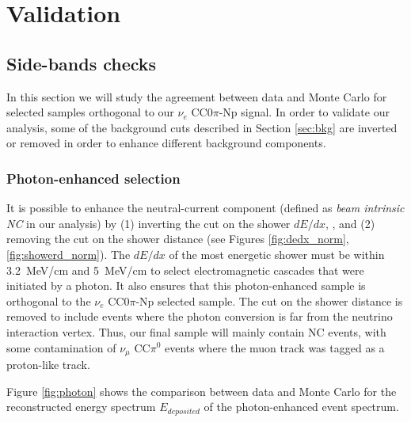 
\section{Validation}

\subsection{Side-bands checks}
In this section we will study the agreement between data and Monte Carlo for selected samples orthogonal to our $\nu_{e}$ CC0$\pi$-Np signal. In order to validate our analysis, some of the background cuts described in Section \ref{sec:bkg} are inverted or removed in order to enhance different background components.
\subsubsection{Photon-enhanced selection}
It is possible to enhance the neutral-current component (defined as \emph{beam intrinsic NC} in our analysis) by (1) inverting the cut on the shower $dE/dx$, , and (2) removing the cut on the shower distance (see Figures \ref{fig:dedx_norm}, \ref{fig:showerd_norm}). The $dE/dx$ of the most energetic shower must be within 3.2~MeV/cm and 5~MeV/cm to select electromagnetic cascades that were initiated by a photon. It also ensures that this photon-enhanced sample is orthogonal to the $\nu_{e}$ CC0$\pi$-Np selected sample. The cut on the shower distance is removed to include events where the photon conversion is far from the neutrino interaction vertex.
Thus, our final sample will mainly contain NC events, with some contamination of $\nu_{\mu}$ CC$\pi^{0}$ events where the muon track was tagged as a proton-like track.

Figure \ref{fig:photon} shows the comparison between data and Monte Carlo for the reconstructed energy spectrum $E_{deposited}$ of the photon-enhanced event spectrum. 

